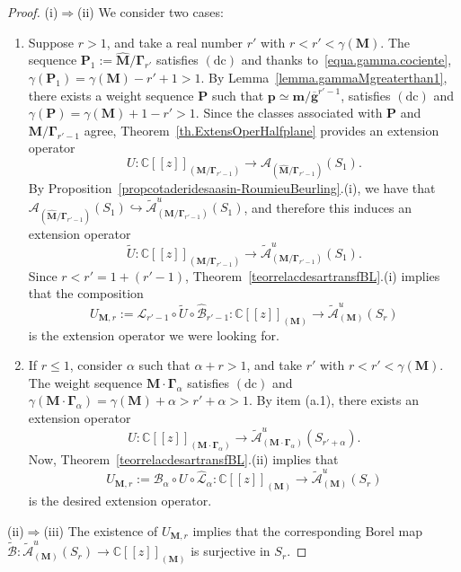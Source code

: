 \documentclass[11pt,a4paper]{article}
\theoremstyle{plain}
\theoremstyle{definition}
\numberwithin{equation}{section}
\newcommand{\CC}{\mathbb{C}}
\newcommand{\al}{\alpha}
\newcommand{\m}{{\boldsymbol{m}}}
\newcommand{\M}{{\boldsymbol{M}}}
\newcommand{\bGa}{{\boldsymbol{\Gamma}}}
\newcommand{\hM}{\widehat{{\boldsymbol{M}}}}
\newcommand{\dc}{\operatorname{(dc)}}
\begin{document}
\begin{proof}
	(i)$\Rightarrow$(ii) We consider two cases:
	\begin{enumerate}[({a}.1)]
		\item Suppose $r>1$, and take a real number $r'$ with $r<r'<\gamma(\M)$. The sequence $\boldsymbol{P}_1:=\hM/\bGa_{r'}$ satisfies $\dc$ and thanks to~\eqref{equa.gamma.cociente}, $\gamma(\boldsymbol{P}_1)=\gamma(\M)-r'+1>1$. By Lemma~\ref{lemma.gammaMgreaterthan1}, there exists a weight sequence $\boldsymbol{P}$ such that $\boldsymbol{p}\simeq\m/\overline{\boldsymbol{g}}^{r'-1}$, satisfies $\dc$ and $\gamma(\boldsymbol{P})=\gamma(\M)+1-r'>1$. Since the classes associated with $\boldsymbol{P}$ and $\M/\bGa_{r'-1}$ agree, Theorem~\ref{th.ExtensOperHalfplane} provides an extension operator
		$$
		 U\colon\CC[[z]]_{\left(\M/\bGa_{r'-1}\right)}\to \mathcal{A}_{\left(\hM/\bGa_{r'-1}\right)}(S_{1}).
		$$
		By Proposition~\ref{propcotaderidesaasin-RoumieuBeurling}.(i), we have that $\mathcal{A}_{\left(\hM/\bGa_{r'-1}\right)}(S_{1})\hookrightarrow \widetilde{\mathcal{A}}^u_{\left(\M/\bGa_{r'-1}\right)}(S_{1})$, and therefore this induces an extension operator
		$$
		 \widetilde{U}\colon\CC[[z]]_{\left(\M/\bGa_{r'-1}\right)}\to \widetilde{\mathcal{A}}^u_{\left(\M/\bGa_{r'-1}\right)}(S_{1}).
		$$
		Since $r<r'=1+(r'-1)$, Theorem~\ref{teorrelacdesartransfBL}.(i) implies that the composition
		$$
		U_{\M,r}:=\mathcal{L}_{r'-1}\circ\widetilde{U}\circ \widehat{\mathcal{B}}_{r'-1}:\CC[[z]]_{(\M)}\to \widetilde{\mathcal{A}}^u_{(\M)}(S_{r})		$$
		is the extension operator we were looking for.
		\item If $r\le 1$, consider $\al$ such that $\al+r>1$, and take $r'$ with $r<r'<\gamma(\M)$. The weight sequence $\M\cdot{\bGa}_{\al}$ satisfies $\dc$ and $\gamma(\M\cdot{\bGa}_{\al})=\gamma(\M)+\al>r'+\al>1$. By item (a.1), there exists an extension operator
		$$
		U\colon\CC[[z]]_{(\M\cdot{\bGa}_{\al})}\to \widetilde{\mathcal{A}}^u_{(\M\cdot{\bGa}_{\al})}(S_{r'+\al}).
		$$
		Now, Theorem~\ref{teorrelacdesartransfBL}.(ii) implies that
		$$
		U_{\M,r}:=\mathcal{B}_{\al}\circ U\circ \widehat{\mathcal{L}}_{\al}:\CC[[z]]_{(\M)}\to \widetilde{\mathcal{A}}^u_{(\M)}(S_{r})
		$$
is the desired extension operator.
	\end{enumerate}\par\noindent
	(ii)$\Rightarrow$(iii)  The existence of $U_{\M,r}$ implies that the corresponding Borel map $ \widetilde{\mathcal{B}}:\widetilde{\mathcal{A}}^u_{(\M)}(S_{r})\to\CC[[z]]_{(\M)}$ is surjective in $S_r$.\par\noindent

\end{proof}
\end{document}
